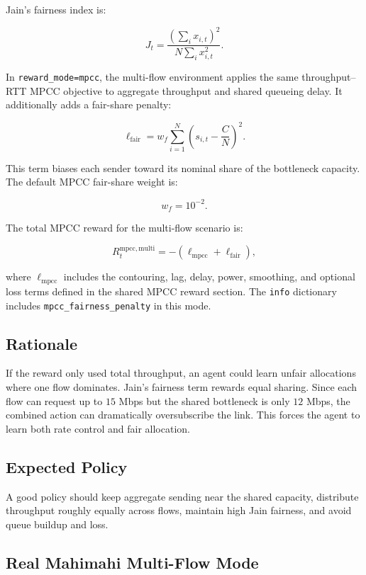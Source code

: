 \documentclass[11pt]{article}
\begin{document}
Jain's fairness index is:

\[
J_t =
\frac{\left(\sum_i x_{i,t}\right)^2}
{N \sum_i x_{i,t}^2}.
\]

In \texttt{reward\_mode=mpcc}, the multi-flow environment applies the same
throughput--RTT MPCC objective to aggregate throughput and shared queueing
delay. It additionally adds a fair-share penalty:

\[
\ell_{\mathrm{fair}} =
w_f \sum_{i=1}^{N}
\left(s_{i,t} - \frac{C}{N}\right)^2.
\]

This term biases each sender toward its nominal share of the bottleneck
capacity. The default MPCC fair-share weight is:

\[
w_f = 10^{-2}.
\]

The total MPCC reward for the multi-flow scenario is:

\[
R_t^{\mathrm{mpcc,multi}} =
-\left(\ell_{\mathrm{mpcc}} + \ell_{\mathrm{fair}}\right),
\]

where \(\ell_{\mathrm{mpcc}}\) includes the contouring, lag, delay, power,
smoothing, and optional loss terms defined in the shared MPCC reward section.
The \texttt{info} dictionary includes \texttt{mpcc\_fairness\_penalty} in this
mode.

\subsection{Rationale}

If the reward only used total throughput, an agent could learn unfair
allocations where one flow dominates. Jain's fairness term rewards equal
sharing. Since each flow can request up to \(15\) Mbps but the shared bottleneck
is only \(12\) Mbps, the combined action can dramatically oversubscribe the
link. This forces the agent to learn both rate control and fair allocation.

\subsection{Expected Policy}

A good policy should keep aggregate sending near the shared capacity, distribute
throughput roughly equally across flows, maintain high Jain fairness, and avoid
queue buildup and loss.

\subsection{Real Mahimahi Multi-Flow Mode}
\end{document}
